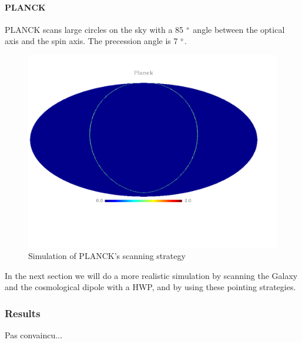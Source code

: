 \paragraph{PLANCK \\}
PLANCK scans large circles on the sky with a 85 $\degree$ angle between the optical axis and the spin axis. The precession angle is 7 $\degree$.

\begin{figure}[h]
\center
	\includegraphics[scale=0.3]{Figures/scan_strat_planck.pdf}
	\caption{Simulation of PLANCK's scanning strategy}
	\label{fig:strat_epic}
\end{figure}

In the next section we will do a more realistic simulation by scanning the Galaxy and the cosmological dipole with a HWP, and by using these pointing strategies. 

\subsubsection{Results}
Pas convaincu...



